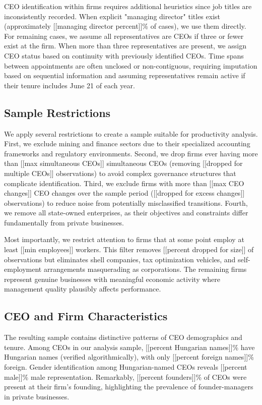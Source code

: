 \documentclass[11pt,a4paper]{article}
\begin{document}
CEO identification within firms requires additional heuristics since job titles are inconsistently recorded. When explicit "managing director" titles exist (approximately [[managing director percent]]\% of cases), we use them directly. For remaining cases, we assume all representatives are CEOs if three or fewer exist at the firm. When more than three representatives are present, we assign CEO status based on continuity with previously identified CEOs. Time spans between appointments are often unclosed or non-contiguous, requiring imputation based on sequential information and assuming representatives remain active if their tenure includes June 21 of each year.

\subsection{Sample Restrictions}

We apply several restrictions to create a sample suitable for productivity analysis. First, we exclude mining and finance sectors due to their specialized accounting frameworks and regulatory environments. Second, we drop firms ever having more than [[max simultaneous CEOs]] simultaneous CEOs (removing [[dropped for multiple CEOs]] observations) to avoid complex governance structures that complicate identification. Third, we exclude firms with more than [[max CEO changes]] CEO changes over the sample period ([[dropped for excess changes]] observations) to reduce noise from potentially misclassified transitions. Fourth, we remove all state-owned enterprises, as their objectives and constraints differ fundamentally from private businesses.

Most importantly, we restrict attention to firms that at some point employ at least [[min employees]] workers. This filter removes [[percent dropped for size]] of observations but eliminates shell companies, tax optimization vehicles, and self-employment arrangements masquerading as corporations. The remaining firms represent genuine businesses with meaningful economic activity where management quality plausibly affects performance.

\subsection{CEO and Firm Characteristics}

The resulting sample contains distinctive patterns of CEO demographics and tenure. Among CEOs in our analysis sample, [[percent Hungarian names]]\% have Hungarian names (verified algorithmically), with only [[percent foreign names]]\% foreign. Gender identification among Hungarian-named CEOs reveals [[percent male]]\% male representation. Remarkably, [[percent founders]]\% of CEOs were present at their firm's founding, highlighting the prevalence of founder-managers in private businesses.
\end{document}
